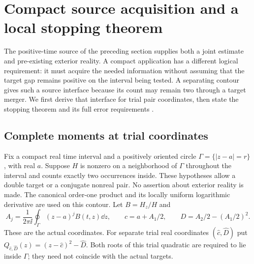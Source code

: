 \section{Compact source acquisition and a local stopping theorem}
\label{sec:compact}

The positive-time source of the preceding section supplies both a joint
estimate and pre-existing exterior reality. A compact application has a
different logical requirement: it must acquire the needed information
without assuming that the target gap remains positive on the interval
being tested. A separating contour gives such a source interface because
its count may remain two through a target merger. We first derive that
interface for trial pair coordinates, then state the stopping theorem and
its full error requirements \cite{BakerCM27}.

\subsection{Complete moments at trial coordinates}

Fix a compact real time interval and a positively oriented circle
$\Gamma=\{|z-a|=r\}$, with real $a$. Suppose $H$ is nonzero on a
neighborhood of $\Gamma$ throughout the interval and counts exactly two
occurrences inside. These hypotheses allow a double target or a conjugate
nonreal pair. No assertion about exterior reality is made. The canonical
order-one product and its locally uniform logarithmic derivative are
used on this contour. Let $B=H_z/H$ and
\[
 A_j=\frac1{2\pi\ii}\oint_\Gamma(z-a)^jB(t,z)\dd z,
 \qquad c=a+A_1/2,\qquad D=A_2/2-(A_1/2)^2.
\]
These are the actual coordinates. For separate trial real coordinates
$(\widehat c,\widehat D)$ put
$Q_{\!\widehat c,\widehat D}(z)=(z-\widehat c)^2-\widehat D$.
Both roots of this trial quadratic are required to lie inside $\Gamma$;
they need not coincide with the actual targets.

